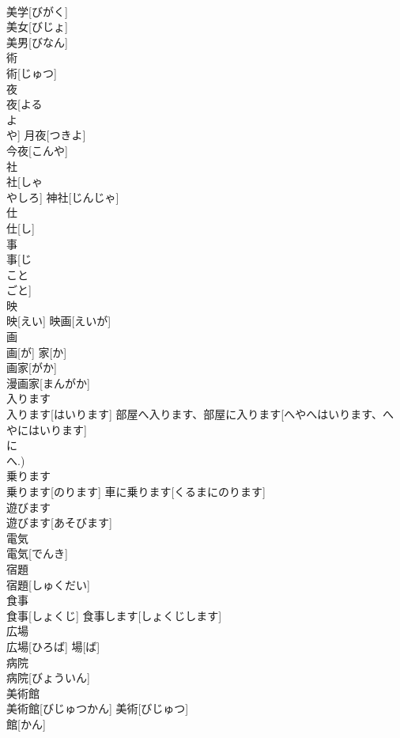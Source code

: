 \documentclass[8pt]{extreport}
\begin{document}
\begin{CJK}{UTF8}{min}
\\	美学[びがく] 
\\	美女[びじょ] 
\\	美男[びなん] 
\\	術	
\\	術[じゅつ]	
\\	夜	
\\	夜[よる 
\\	よ 
\\	や]	月夜[つきよ] 
\\	今夜[こんや] 
\\	社	
\\	社[しゃ 
\\	やしろ]	神社[じんじゃ] 
\\	仕	
\\	仕[し]	
\\	事	
\\	事[じ 
\\	こと 
\\	ごと]	
\\	映	
\\	映[えい]	映画[えいが] 
\\	画	
\\	画[が]	家[か] 
\\	画家[がか] 
\\	漫画家[まんがか] 
\\	入ります	
\\	入ります[はいります]	部屋へ入ります、部屋に入ります[へやへはいります、へやにはいります] 
\\	に 
\\	へ.)
\\	乗ります	
\\	乗ります[のります]	車に乗ります[くるまにのります] 
\\	遊びます	
\\	遊びます[あそびます]	
\\	電気	
\\	電気[でんき]	
\\	宿題	
\\	宿題[しゅくだい]	
\\	食事	
\\	食事[しょくじ]	食事します[しょくじします] 
\\	広場	
\\	広場[ひろば]	場[ば] 
\\	病院	
\\	病院[びょういん]	
\\	美術館	
\\	美術館[びじゅつかん]	美術[びじゅつ] 
\\	館[かん] 

\end{CJK}
\end{document}
